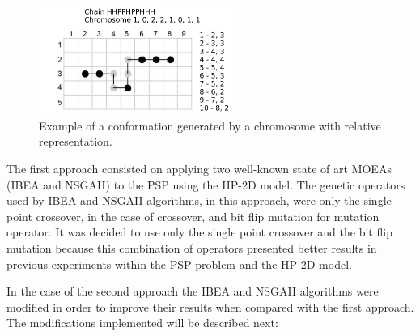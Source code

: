 \begin{figure}[ht]
	\centering
	\includegraphics[width=2.5in]{figures/figure3.png}
	\caption{Example of a conformation generated by a chromosome with relative representation.}
	\label{fig_sim}
\end{figure}


The first approach consisted on applying two well-known state of art MOEAs (IBEA and NSGAII) to the PSP using the HP-2D model. The genetic operators used by IBEA and NSGAII algorithms, in this approach, were only the single point crossover, in the case of crossover, and bit flip mutation for mutation operator. It was decided to use only the single point crossover and the bit flip mutation because this combination of operators presented better results in previous experiments within the PSP problem and the HP-2D model.

In the case of the second approach the IBEA and NSGAII algorithms were modified in order to improve their results when compared with the first approach. The modifications implemented will be described next:

